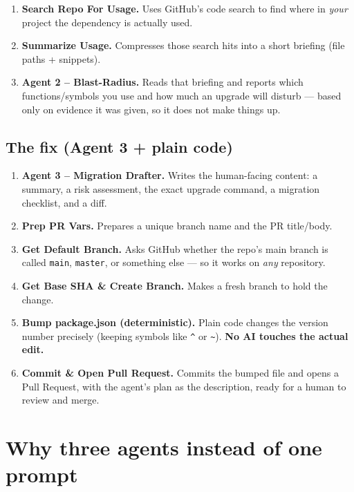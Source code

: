 \documentclass[11pt,a4paper]{article}
\begin{document}
\begin{enumerate}[leftmargin=1.5em, start=9]
  \item \textbf{Search Repo For Usage.} Uses GitHub's code search to find where in \emph{your} project
    the dependency is actually used.
  \item \textbf{Summarize Usage.} Compresses those search hits into a short briefing (file paths +
    snippets).
  \item \textbf{Agent 2 -- Blast-Radius.} Reads that briefing and reports which functions/symbols you
    use and how much an upgrade will disturb --- based only on evidence it was given, so it does not
    make things up.
\end{enumerate}

\subsection{The fix (Agent 3 + plain code)}

\begin{enumerate}[leftmargin=1.5em, start=12]
  \item \textbf{Agent 3 -- Migration Drafter.} Writes the human-facing content: a summary, a risk
    assessment, the exact upgrade command, a migration checklist, and a diff.
  \item \textbf{Prep PR Vars.} Prepares a unique branch name and the PR title/body.
  \item \textbf{Get Default Branch.} Asks GitHub whether the repo's main branch is called \texttt{main},
    \texttt{master}, or something else --- so it works on \emph{any} repository.
  \item \textbf{Get Base SHA \& Create Branch.} Makes a fresh branch to hold the change.
  \item \textbf{Bump package.json (deterministic).} Plain code changes the version number precisely
    (keeping symbols like \texttt{\^{}} or \texttt{\~{}}). \textbf{No AI touches the actual edit.}
  \item \textbf{Commit \& Open Pull Request.} Commits the bumped file and opens a Pull Request, with the
    agent's plan as the description, ready for a human to review and merge.
\end{enumerate}

\section{Why three agents instead of one prompt}
\end{document}
